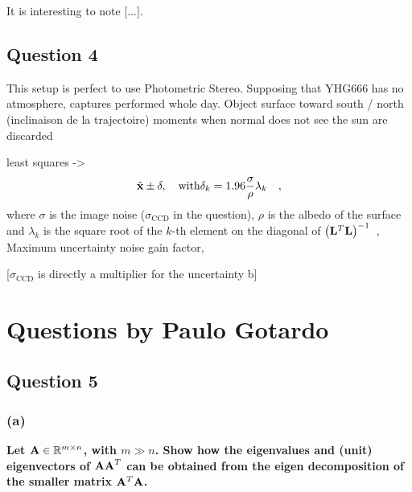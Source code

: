 \documentclass{report}
\begin{document}
It is interesting to note [...].

\section{Question 4}

This setup is perfect to use Photometric Stereo.
Supposing that YHG666 has no atmosphere, captures performed whole day.
Object surface toward south / north (inclinaison de la trajectoire)
moments when normal does not see the sun are discarded



least squares ->
\begin{equation}
\hat{\mathbf{x}} \pm \mathbf{\delta} , \quad \text{with} \delta_k = 1.96\frac{\sigma}{\rho}\lambda_k
\quad,
\end{equation}
where $\sigma$ is the image noise ($\sigma_\text{CCD}$ in the question), $\rho$ is the albedo of the surface and $\lambda_k$ is the square root of the $k$-th element on the diagonal of $\left(\mathbf{L}^T\mathbf{L}\right)^{-1}$~\cite{Hastie-09},
Maximum uncertainty noise gain factor, \cite{holdgeoffroy-3dv-15}

[$\sigma_\text{CCD}$ is directly a multiplier for the uncertainty b]

\chapter{Questions by Paulo Gotardo}

\section{Question 5}
\subsection{(a)}
\textbf{Let $\mathbf{A} \in \mathbb{R}^{m \times n}$, with $m \gg n$. Show how the eigenvalues and (unit) eigenvectors of $\mathbf{AA}^T$ can be obtained from the eigen decomposition of the smaller matrix $\mathbf{A}^T\mathbf{A}$.}
\end{document}
